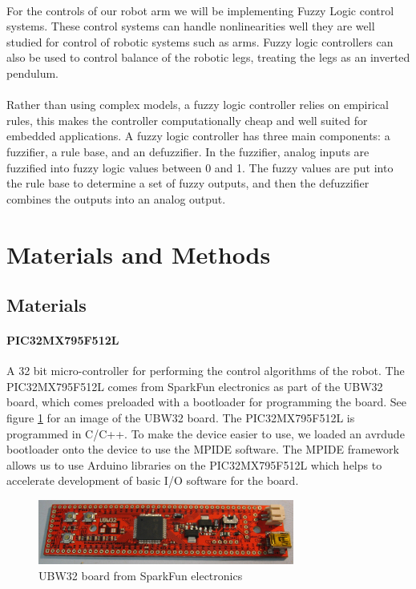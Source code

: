 \documentclass[titlepage,letterpaper,12pt]{article}
\begin{document}
\paragraph{}For the controls of our robot arm we will be implementing Fuzzy
Logic control systems. These control systems can handle nonlinearities well they
are well studied for control of robotic systems such as arms\cite{Scharf1985}.
Fuzzy logic controllers can also be used to control balance of the robotic legs,
treating the legs as an inverted pendulum\cite{hwang1992stability}.

\paragraph{}Rather than using complex models, a fuzzy logic controller relies on
empirical rules, this makes the controller computationally cheap and well suited
for embedded applications. A fuzzy logic controller has three main components: a
fuzzifier, a rule base, and an defuzzifier. In the fuzzifier, analog inputs are
fuzzified into fuzzy logic values between 0 and 1. The fuzzy values are put into
the rule base to determine a set of fuzzy outputs, and then the defuzzifier
combines the outputs into an analog output\cite{Mailah2000}.


\section{Materials and Methods}
\subsection{Materials}
\paragraph{PIC32MX795F512L}A 32 bit micro-controller for performing the control
algorithms of the robot. The PIC32MX795F512L comes from SparkFun electronics as
part of the UBW32 board, which comes preloaded with a bootloader for programming
the board. See figure \ref{ubw32fig} for an image of the UBW32 board. The
PIC32MX795F512L is programmed in C/C++. To make the device easier to use, we
loaded an avrdude bootloader onto the device to use the MPIDE software. The
MPIDE framework allows us to use Arduino libraries on the PIC32MX795F512L which
helps to accelerate development of basic I/O software for the
board\cite{pic32data}.

\begin{figure}
  \centering
    \includegraphics[width=0.75\textwidth]{figures/UBW32_v24_SparkFun.JPG}
  \caption{UBW32 board from SparkFun electronics\protect\cite{Schmalz2013}}
  \label{ubw32fig}
\end{figure}
\end{document}
